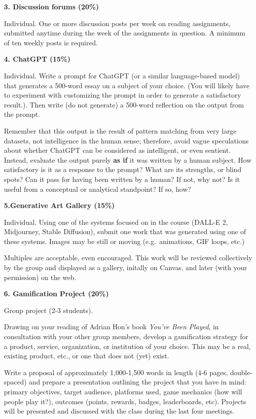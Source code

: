 \documentclass[
  letterpaper,
  DIV=11,
  numbers=noendperiod]{scrartcl}
\begin{document}
\textbf{3. Discussion forums (20\%)}

Individual. One or more discussion posts per week on reading
assignments, submitted anytime during the week of the assignments in
question. A minimum of ten weekly posts is required.

\textbf{4. ChatGPT (15\%)}

Individual. Write a prompt for ChatGPT (or a similar language-based
model) that generates a 500-word essay on a subject of your choice. (You
will likely have to experiment with customizing the prompt in order to
generate a satisfactory result.). Then write (do not generate) a
500-word reflection on the output from the prompt.

Remember that this output is the result of pattern matching from very
large datasets, not intelligence in the human sense; therefore, avoid
vague speculations about whether ChatGPT can be considered as
intelligent, or even sentient. Instead, evaluate the output purely
\textbf{as if} it was written by a human subject. How satisfactory is it
as a response to the prompt? What are its strengths, or blind spots? Can
it pass for having been written by a human? If not, why not? Is it
useful from a conceptual or analytical standpoint? If so, how?

\textbf{5.Generative Art Gallery (15\%)}

Individual. Using one of the systems focused on in the course (DALL-E 2,
Midjourney, Stable Diffusion), submit one work that was generated using
one of these systems. Images may be still or moving (e.g.~animations,
GIF loops, etc.)

Multiples are acceptable, even encouraged. This work will be reviewed
collectively by the group and displayed as a gallery, initally on
Canvas, and later (with your permission) on the web.

\textbf{6. Gamification Project (20\%)}

Group project (2-3 students).

Drawing on your reading of Adrian Hon's book \emph{You've Been Played},
in consultation with your other group members, develop a gamification
strategy for a product, service, organization, or institution of your
choice. This may be a real, existing product, etc., or one that does not
(yet) exist.

Write a proposal of approximately 1,000-1,500 words in length (4-6
pages, double-spaced) and prepare a presentation outlining the project
that you have in mind: primary objectives, target audience, platforms
used, game mechanics (how will people play it?), outcomes (points,
rewards, badges, leaderboards, etc). Projects will be presented and
discussed with the class during the last four meetings.
\end{document}
